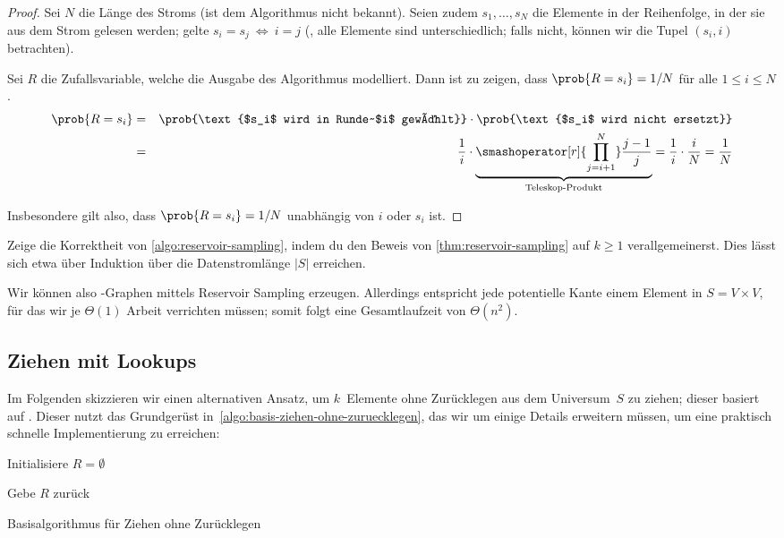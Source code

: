 \begin{proof}
    Sei $N$ die Länge des Stroms (ist dem Algorithmus nicht bekannt).
    Seien zudem $s_1, \ldots, s_N$ die Elemente in der Reihenfolge, in der sie aus dem Strom gelesen werden;
    \oBdA gelte $s_i = s_j \ \Leftrightarrow\ i = j$ (\dh, alle Elemente sind unterschiedlich; falls nicht, können wir die Tupel $(s_i, i)$ betrachten).

    Sei $R$ die Zufallsvariable, welche die Ausgabe des Algorithmus modelliert.
    Dann ist zu zeigen, dass $\prob{R = s_i} = 1 / N$ für alle $1 \le i \le N$.
    \begin{eqnarray}
        \prob{R = s_i} &=& \prob{\text{$s_i$ wird in Runde~$i$ gewählt}} \cdot \prob{\text{$s_i$ wird nicht ersetzt}} \\
        &=& \frac{1}{i} \cdot \underbrace{\smashoperator[r]{\prod_{j=i+1}^N} \frac{j-1}{j}}_{\text{Teleskop-Produkt}}
        = \frac{1}{i} \cdot \frac{i}{N} = \frac{1}{N}
    \end{eqnarray}

    \noindent Insbesondere gilt also, dass $\prob{R = s_i} = 1/N$ unabhängig von $i$ oder $s_i$ ist.
\end{proof}

\begin{exercise}
    Zeige die Korrektheit von \cref{algo:reservoir-sampling}, indem du den Beweis von \cref{thm:reservoir-sampling} auf $k \ge 1$ verallgemeinerst.
    Dies lässt sich etwa über Induktion über die Datenstromlänge $|S|$ erreichen.
\end{exercise}

Wir können also \Gnm-Graphen mittels Reservoir Sampling erzeugen.
Allerdings entspricht jede potentielle Kante einem Element in $S = V \times V$, für das wir je $\Theta(1)$ Arbeit verrichten müssen;
somit folgt eine Gesamtlaufzeit von $\Theta(n^2)$.

\subsection{Ziehen mit Lookups}
Im Folgenden skizzieren wir einen alternativen Ansatz, um $k$~Elemente ohne Zurücklegen aus dem Universum~$S$ zu ziehen; dieser basiert auf \cite{batagelj2005efficient}.
Dieser nutzt das Grundgerüst in~\cref{algo:basis-ziehen-ohne-zuruecklegen}, das wir um einige Details erweitern müssen, um eine praktisch schnelle Implementierung zu erreichen:

\begin{algorithm}[H]

    Initialisiere $R = \emptyset$\;


    Gebe $R$ zurück

    \caption{Basisalgorithmus für Ziehen ohne Zurücklegen}
    \label{algo:basis-ziehen-ohne-zuruecklegen}
\end{algorithm}

